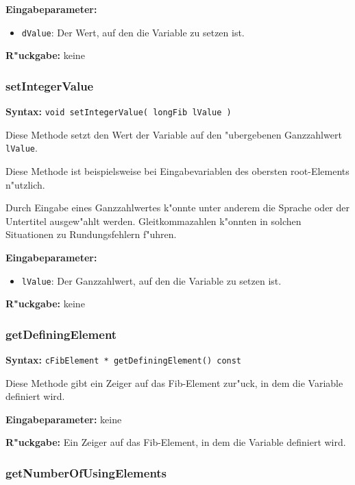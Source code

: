 \bigskip\noindent
\textbf{Eingabeparameter:}
\begin{itemize}
 \item \verb|dValue|: Der Wert, auf den die Variable zu setzen ist.
\end{itemize}

\bigskip\noindent
\textbf{R"uckgabe:} keine


\subsubsection{setIntegerValue}

\textbf{Syntax:} \verb|void setIntegerValue( longFib lValue )|

\bigskip\noindent
Diese Methode setzt den Wert der Variable auf den "ubergebenen Ganzzahlwert \verb|lValue|.

Diese Methode ist beispielsweise bei Eingabevariablen des obersten root-\-Ele\-men\-ts n"utzlich.

Durch Eingabe eines Ganzzahlwertes k"onnte unter anderem die Sprache oder der Untertitel ausgew"ahlt werden. Gleitkommazahlen k"onnten in solchen Situationen zu Rundungsfehlern f"uhren.

\bigskip\noindent
\textbf{Eingabeparameter:}
\begin{itemize}
 \item \verb|lValue|: Der Ganzzahlwert, auf den die Variable zu setzen ist.
\end{itemize}

\bigskip\noindent
\textbf{R"uckgabe:} keine


\subsubsection{getDefiningElement}

\textbf{Syntax:} \verb|cFibElement * getDefiningElement() const|

\bigskip\noindent
Diese Methode gibt ein Zeiger auf das Fib-Element zur"uck, in dem die Variable definiert wird.

\bigskip\noindent
\textbf{Eingabeparameter:} keine

\bigskip\noindent
\textbf{R"uckgabe:} Ein Zeiger auf das Fib-Element, in dem die Variable definiert wird.


\subsubsection{getNumberOfUsingElements}

